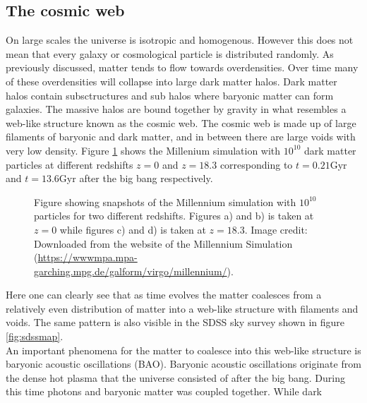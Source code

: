 \subsection{The cosmic web}
On large scales the universe is isotropic and homogenous. However this does not
mean that every galaxy or cosmological particle is distributed randomly. As
previously discussed, matter tends to flow towards overdensities. Over time many
of these overdensities will collapse into large dark matter halos. Dark matter
halos contain subsctructures and sub halos where baryonic matter can form
galaxies. The massive halos are bound together by gravity in what resembles a
web-like structure known as the cosmic web. The cosmic web is made up of large
filaments of baryonic and dark matter, and in between there are large voids with
very low density. Figure \ref{fig:millenium} shows the Millenium simulation with
$10^{10}$ dark matter particles at different redshifts $z=0$ and $z=18.3$ corresponding to
$t=0.21$Gyr and $t=13.6$Gyr after the big bang respectively.
\begin{figure}[htbp]
    \hspace{1em}%
    \hspace{1em}%
    \caption{Figure showing snapshots of the Millennium simulation with $10^{10}$ particles
    for two different redshifts. Figures a) and b) is taken at $z=0$ while
    figures c) and d) is taken at $z=18.3$. Image credit: Downloaded from the
    website of the Millennium Simulation\cite{Millennium} (\url{https://wwwmpa.mpa-garching.mpg.de/galform/virgo/millennium/}).}
    \label{fig:millenium}
\end{figure}
Here one can clearly see that as time evolves the matter coalesces from a
relatively even distribution of matter into a web-like structure with filaments
and voids. The same pattern is also visible in the SDSS sky survey shown in
figure \ref{fig:sdssmap}.\\\indent
An important phenomena for the matter to coalesce into this web-like structure is
baryonic acoustic oscillations (BAO). Baryonic acoustic oscillations originate
from the dense hot plasma that the universe consisted of after the big bang.
During this time photons and baryonic matter was coupled together. While dark
